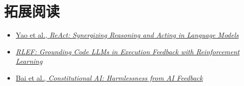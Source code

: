 \section{拓展阅读}

\begin{itemize}
    \item \href{https://arxiv.org/abs/2210.03629}{Yao et al., \emph{ReAct: Synergizing Reasoning and Acting in Language Models}}
    \item \href{https://arxiv.org/abs/2410.02089}{\emph{RLEF: Grounding Code LLMs in Execution Feedback with Reinforcement Learning}}
    \item \href{https://arxiv.org/abs/2212.08073}{Bai et al., \emph{Constitutional AI: Harmlessness from AI Feedback}}
\end{itemize}

